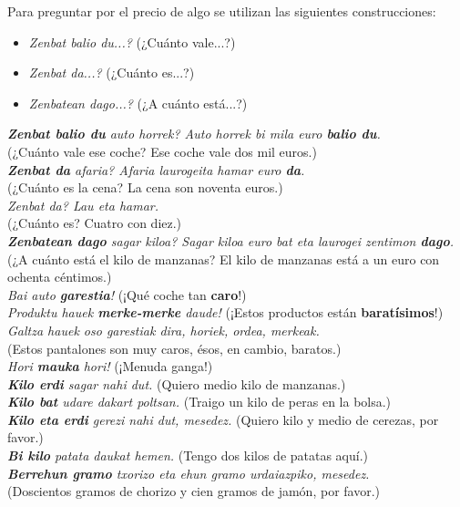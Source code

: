 \documentclass[11pt, a4paper]{article}
\begin{document}
\noindent Para preguntar por el precio de algo se utilizan las siguientes construcciones:
\begin{itemize}
\item \textit{Zenbat balio du...?} (¿Cuánto vale...?)
\item \textit{Zenbat da...?} (¿Cuánto es...?)
\item \textit{Zenbatean dago...?} (¿A cuánto está...?)
\end{itemize}

\indent \textit{\textbf{Zenbat balio du} auto horrek? Auto horrek bi mila euro \textbf{balio du}.}\\\indent(¿Cuánto vale ese coche? Ese coche vale dos mil euros.)\\
\indent \textit{\textbf{Zenbat da} afaria? Afaria laurogeita hamar euro \textbf{da}.}\\\indent(¿Cuánto es la cena? La cena son noventa euros.)\\
\indent \textit{Zenbat da? Lau eta hamar.}\\\indent(¿Cuánto es? Cuatro con diez.)\\
\indent \textit{\textbf{Zenbatean dago} sagar kiloa? Sagar kiloa euro bat eta laurogei zentimon \textbf{dago}.}\\\indent(¿A cuánto está el kilo de manzanas? El kilo de manzanas está a un euro con ochenta céntimos.)\\

\indent \textit{Bai auto \textbf{garestia}!} (¡Qué coche tan \textbf{caro}!)\\
\indent \textit{Produktu hauek \textbf{merke-merke} daude!} (¡Estos productos están \textbf{baratísimos}!)\\
\indent \textit{Galtza hauek oso garestiak dira, horiek, ordea, merkeak.}\\\indent(Estos pantalones son muy caros, ésos, en cambio, baratos.)\\
\indent \textit{Hori \textbf{mauka} hori!} (¡Menuda ganga!)\\


\indent \textit{\textbf{Kilo erdi} sagar nahi dut.}
(Quiero medio kilo de manzanas.)\\
\indent \textit{\textbf{Kilo bat} udare dakart poltsan.}
(Traigo un kilo de peras en la bolsa.)\\
\indent \textit{\textbf{Kilo eta erdi} gerezi nahi dut, mesedez.}
(Quiero kilo y medio de cerezas, por favor.)\\
\indent \textit{\textbf{Bi kilo} patata daukat hemen.}
(Tengo dos kilos de patatas aquí.)\\
\indent \textit{\textbf{Berrehun gramo} txorizo eta ehun gramo urdaiazpiko, mesedez.}\\
\indent (Doscientos gramos de chorizo y cien gramos de jamón, por favor.)
\end{document}
